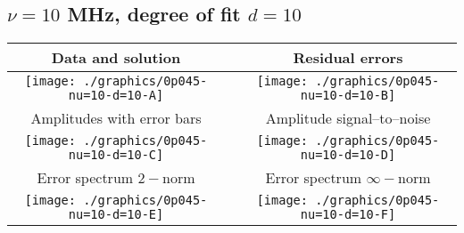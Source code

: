 

% 

\clearpage{}
\break{}

\subsection{$\nu = 10$ MHz, degree of fit $d = 10$}

\begin{table}[h]
    \begin{center}
        \begin{tabular}{ccc}
            Data and solution & \quad & Residual errors \\\hline
            \texttt{[image: ./graphics/0p045-nu=10-d=10-A]} &&
            \texttt{[image: ./graphics/0p045-nu=10-d=10-B]} \\[15pt]
            Amplitudes with error bars && Amplitude signal--to--noise \\\hline
            \texttt{[image: ./graphics/0p045-nu=10-d=10-C]} &&
            \texttt{[image: ./graphics/0p045-nu=10-d=10-D]} \\[15pt]
            Error spectrum $2-$norm && Error spectrum $\infty-$norm \\\hline
            \texttt{[image: ./graphics/0p045-nu=10-d=10-E]} &&
            \texttt{[image: ./graphics/0p045-nu=10-d=10-F]} \\[15pt]
        \end{tabular}
    \end{center}
\label{fig:elev=45, nu=10}
\end{table}



\endinput
